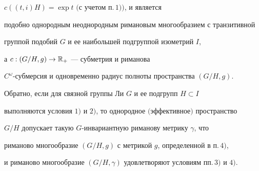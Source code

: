 \begin{thms}
\begin{itemize}
$c((t,i)H)=\exp t$ $($с учетом п.\,$1))$, и является


подобно однородным неоднородным римановым многообразием с транзитивной


группой подобий $G$ и ее наибольшей подгруппой изометрий $I$,


а $c:(G/H,g)\rightarrow \Bbb{R}_{+}$ --- субметрия и риманова


$C^{\omega}$-субмерсия и одновременно радиус полноты пространства $(G/H,g)$.


\end{itemize}





Обратно, если для связной группы Ли $G$ и ее подгрупп $H \subset I$


выполняются условия $1)$ и $2)$, то однородное $($эффективное$)$ пространство


$G/H$ допускает такую $G$-инвариантную риманову метрику $\gamma$, что


риманово многообразие $(G/H,g)$ с метрикой $g$, определенной в п.\,$4)$,


и риманово многообразие $(G/H,\gamma)$ удовлетворяют условиям пп.\,$3)$ и $4)$.


\end{thms}





